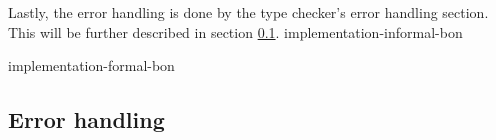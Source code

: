 Lastly, the error handling is done by the type checker's error handling section. This will be further described in section \ref{implementation-error-handling}.
{implementation-informal-bon}

{implementation-formal-bon}

\subsection{Error handling}
\label{implementation-error-handling}